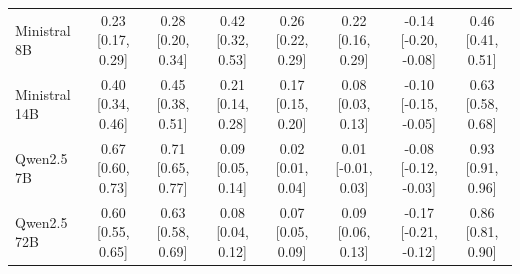 \documentclass[10pt,a4paper]{article}
\begin{document}
\begin{scriptsize}
\begin{longtable}{lccccccc}
Ministral 8B & 0.23 [0.17, 0.29] & 0.28 [0.20, 0.34] & 0.42 [0.32, 0.53] & 0.26 [0.22, 0.29] & 0.22 [0.16, 0.29] & -0.14 [-0.20, -0.08] & 0.46 [0.41, 0.51] \\
Ministral 14B & 0.40 [0.34, 0.46] & 0.45 [0.38, 0.51] & 0.21 [0.14, 0.28] & 0.17 [0.15, 0.20] & 0.08 [0.03, 0.13] & -0.10 [-0.15, -0.05] & 0.63 [0.58, 0.68] \\
Qwen2.5 7B & 0.67 [0.60, 0.73] & 0.71 [0.65, 0.77] & 0.09 [0.05, 0.14] & 0.02 [0.01, 0.04] & 0.01 [-0.01, 0.03] & -0.08 [-0.12, -0.03] & 0.93 [0.91, 0.96] \\
Qwen2.5 72B & 0.60 [0.55, 0.65] & 0.63 [0.58, 0.69] & 0.08 [0.04, 0.12] & 0.07 [0.05, 0.09] & 0.09 [0.06, 0.13] & -0.17 [-0.21, -0.12] & 0.86 [0.81, 0.90] \\
\end{longtable}
\end{scriptsize}
\end{document}
